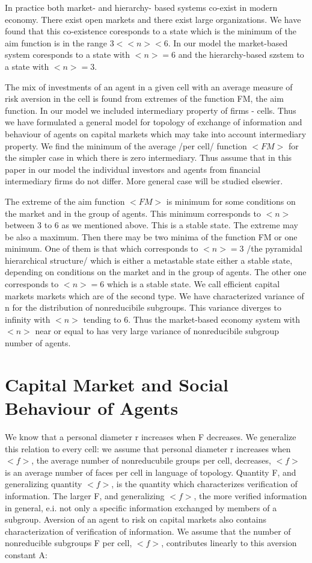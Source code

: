 \documentclass[10pt]{article}
\begin{document}
In practice both market- and hierarchy- based systems co-exist in modern economy. There exist open markets and there exist large organizations.
We have found that this co-existence coresponds to a state which is the minimum of the aim function is in the range $ 3 < <n> <6$. In our model the market-based system coresponds to a state with $<n> = 6$ and the hierarchy-based szstem to a state with $<n> = 3$.

The mix of investments of an agent in a given cell with an average measure of risk aversion in the cell is found from
extremes of the function FM, the aim function. In our model we included intermediary property of firms - cells. Thus we have formulated a general model for topology of exchange of information and behaviour of agents on capital markets which may take into account intermediary property. We find the minimum of the average  /per cell/ function $<FM>$ for the simpler case in which there is zero intermediary. Thus assume that in this paper in our model the individual investors and agents from financial intermediary firms do not differ. More general case will be studied elsewier.

The extreme of the aim function $<FM>$ is minimum for some conditions on the market and in the group of agents. This minimum corresponds to $<n>$ between 3 to 6 as we mentioned above.
This is a stable state. The extreme may be also a maximum. Then there may be two minima of the function FM or one minimum. One of them is that which corresponds to $<n> = 3$ /the pyramidal hierarchical structure/ which is either a metastable state either a stable state,
depending on conditions on the market and in the group of agents.
 The other one corresponds to $<n> = 6$  which is a stable state. We call efficient capital markets markets which are of the second type. We have characterized variance of n for the distribution of nonreducibile subgroups. This variance diverges to infinity with $<n>$ tending to 6. Thus the market-based economy system with $ <n> $ near 
   or equal to has very large variance of nonreducibile subgroup number of agents.
   
   
   
\section{Capital Market and Social Behaviour of Agents}

We know \cite{5}  that a personal diameter r increases when F decreases. We generalize this relation to every cell: we assume that personal diameter r increases when $<f>$, the average number of nonreducubile groups per cell, decreases, $<f>$ is an average number of faces per cell in language of topology. Quantity F, and generalizing quantity $<f>$, is the quantity which characterizes verification of information. The larger F, and generalizing $ <f> $, the more verified information in general, e.i. not only a specific information exchanged by members of a subgroup. Aversion of an agent to risk on capital
markets also contains characterization of verification of information. We assume that the number of nonreducible subgroups F per cell, $<f>$, contributes linearly to this aversion constant A:
\end{document}

